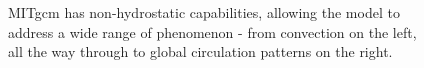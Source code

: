 \begin{figure}
\caption{MITgcm has non-hydrostatic capabilities, allowing
the model to address a wide range of phenomenon - from convection
on the left, all the way through to global circulation patterns on the 
right.
}
\label{fig:all-scales}
\end{figure}
